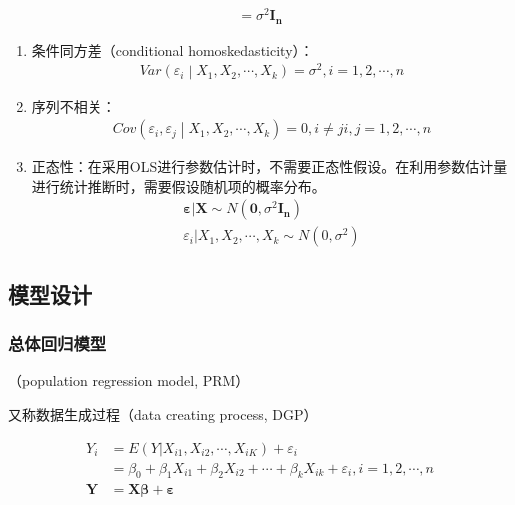 \documentclass[12pt]{book}
\begin{document}
\begin{enumerate}[1.]
\begin{gather*}
              =\sigma^2\mathbf{I_n}
          \end{gather*}
          \begin{enumerate}[(1)]
              \item 条件同方差（conditional homoskedasticity）：
                    \begin{gather*}
                        Var\left(\varepsilon_i\middle| X_1,X_2,\cdots,X_k\right)=\sigma^2,i=1,2,\cdots,n
                    \end{gather*}
              \item 序列不相关：
                    \begin{gather*}
                        Cov\left (\varepsilon_i,\varepsilon_j\middle| X_1,X_2,\cdots,X_k\right)=0,i\neq j  i,j=1,2,\cdots,n
                    \end{gather*}
              \item 正态性：在采用OLS进行参数估计时，不需要正态性假设。在利用参数估计量进行统计推断时，需要假设随机项的概率分布。
                    \begin{gather*}
                        \bm{\varepsilon}|\mathbf{X}\sim N(\mathbf{0},\sigma^2\mathbf{I_n})\\
                        \varepsilon_i|X_1,X_2,\cdots,X_k\sim N(0,\sigma^2)
                    \end{gather*}
          \end{enumerate}
\end{enumerate}



\subsection{模型设计}

\subsubsection{总体回归模型}

（population regression model, PRM）

又称数据生成过程（data creating process, DGP）

\begin{align*}
Y_{i} &= E(Y|X_{i1},X_{i2},\cdots,X_{iK})+\varepsilon_{i}\\ 
&=\beta_{0} + \beta_{1}X_{i1}+\beta_{2}X_{i2}+\cdots+\beta_{k}X_{ik}+\varepsilon_{i}, i=1,2,⋯,n\\ 
\bm{Y}&=\bm{X\beta}+\bm{\varepsilon}
\end{align*}
\end{document}

